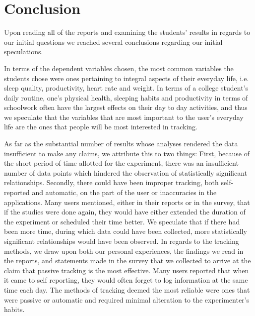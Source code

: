 \section{Conclusion}
Upon reading all of the reports and examining the students' results in regards to our initial questions we reached several conclusions regarding our initial speculations.  
 
In terms of the dependent variables chosen, the most common variables the students chose were ones pertaining to integral aspects of their everyday life, i.e. sleep quality, productivity, heart rate and weight.  In terms of a college student's daily routine, one's physical health, sleeping habits and productivity in terms of schoolwork often have the largest effects on their day to day activities, and thus we speculate that the variables that are most important to the user's everyday life are the ones that people will be most interested in tracking. 
 
As far as the substantial number of results whose analyses rendered the data insufficient to make any claims, we attribute this to two things: First, because of the short period of time allotted for the experiment, there was an insufficient number of data points which hindered the observation of  statistically significant relationships. Secondly, there could have been improper tracking, both self-reported and automatic, on the part of the user or inaccuracies in the applications.  Many users mentioned, either in their reports or in the survey, that if the studies were done again, they would have either extended the duration of the experiment or scheduled their time better.  We speculate that if there had been more time, during which data could have been collected, more statistically significant relationships would have been observed. In regards to the tracking methods, we draw upon both our personal experiences, the findings we read in the reports, and statements made in the survey that we collected to arrive at the claim that passive tracking is the most effective. Many users reported that when it came to self reporting, they would often forget to log information at the same time each day.  The methods of tracking deemed the most reliable were ones that were passive or automatic and required minimal alteration to the experimenter's habits. 
 
